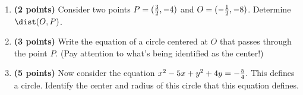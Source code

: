 \begin{tcolorbox}[colback=white,colframe=black,opacityframe=0,colbacktitle=black,title={\textbf{Problem 1 [\examproblemweight\ points]}}]
\begin{enumerate}[label=(\alph*)]
	\item \textbf{(2 points)} Consider two points $P=(\frac{3}{2},-4)$ and $O=(-\frac{1}{2},-8)$. Determine $\dist(O,P)$.
	\item \textbf{(3 points)} Write the equation of a circle centered at $O$ that passes through the point $P$. (Pay attention to what's being identified as the center!)
	\item \textbf{(5 points)} Now consider the equation $x^2-5x + y^2+4y = -\frac{5}{4}.$ This defines a circle. Identify the center and radius of this circle that this equation defines.
\end{enumerate}
\vspace*{10em}
\end{tcolorbox}